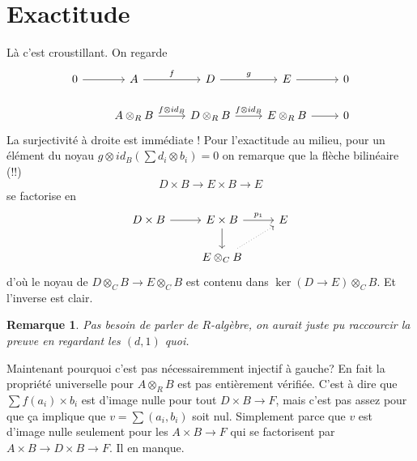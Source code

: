 \documentclass[a4paper,12pt]{article}
\theoremstyle{plain}
\newtheorem{rem}{Remarque}
\theoremstyle{definition}
\theoremstyle{remark}
\begin{document}
\section{Exactitude}
Là c'est croustillant.  On regarde
\[\begin{tikzcd}
	0 & A & D & E & 0 \\
	& {A\otimes_R B} & {D\otimes_R B} & {E\otimes_R B} & 0
	\arrow[from=1-1, to=1-2]
	\arrow["f", from=1-2, to=1-3]
	\arrow["g", from=1-3, to=1-4]
	\arrow[from=1-4, to=1-5]
	\arrow["{f\otimes id_B}", from=2-2, to=2-3]
	\arrow["{f\otimes id_B}", from=2-3, to=2-4]
	\arrow[from=2-4, to=2-5]
\end{tikzcd}\]
La surjectivité à droite est immédiate ! Pour l'exactitude au
milieu, pour un élément du noyau
$g\otimes id_B (\sum d_i\otimes b_i)=0$
on remarque que la flèche bilinéaire (!!)
\[D\times B\to E\times B\to E\]
se factorise en
\[\begin{tikzcd}
	{D\times B} & {E\times B} & E \\
	& {E\otimes_C B}
	\arrow[from=1-1, to=1-2]
	\arrow["{p_1}", from=1-2, to=1-3]
	\arrow[from=1-2, to=2-2]
	\arrow[dotted, from=2-2, to=1-3]
\end{tikzcd}\]
d'où le noyau de $D\otimes_C B\to E\otimes_C B$ est
contenu dans $\ker(D\to E)\otimes_C B$. Et l'inverse est clair.

\begin{rem}
    Pas besoin de parler de $R$-algèbre, on aurait juste pu
    raccourcir la preuve en regardant les $(d,1)$ quoi.
\end{rem}

Maintenant pourquoi c'est pas nécessairemment injectif à gauche? 
En fait la propriété universelle pour $A\otimes_R B$ est pas
entièrement vérifiée. C'est à dire que $\sum f(a_i)\times b_i$ est
d'image nulle pour tout $D\times B\to F$, mais c'est pas assez pour
que ça implique que $v=\sum (a_i,b_i)$ soit nul. Simplement parce
que $v$ est d'image nulle seulement pour les $A\times B\to F$ qui
se factorisent par $A\times B\to D\times B\to F$. Il en manque.
\end{document}
